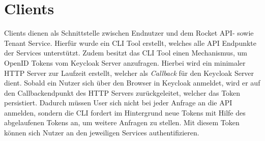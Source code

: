 \section{Clients}
\label{sec:komponenten:clients}

Clients dienen als Schnittstelle zwischen Endnutzer und dem Rocket API- sowie Tenant Service. 
Hierfür wurde ein \ac{CLI} Tool erstellt, welches alle API Endpunkte der Services
unterstützt. Zudem besitzt das \ac{CLI} Tool einen Mechanismus, um OpenID Tokens vom Keycloak Server anzufragen.
Hierbei wird ein minimaler HTTP Server zur Laufzeit erstellt, welcher als \emph{Callback} für den Keycloak Server dient.
Sobald ein Nutzer sich über den Browser in Keycloak anmeldet, wird er auf den Callbackendpunkt des HTTP Servers
zurückgeleitet, welcher das Token persistiert. Dadurch müssen User sich nicht bei jeder Anfrage an die API 
anmelden, sondern die \ac{CLI} fordert im Hintergrund neue Tokens mit Hilfe des abgelaufenen Tokens an,
um weitere Anfragen zu stellen.
Mit diesem Token können sich Nutzer an den jeweiligen Services authentifizieren.